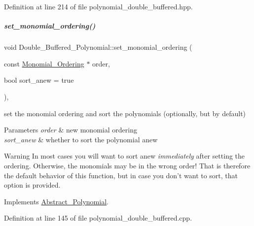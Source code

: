 Definition at line 214 of file polynomial\+\_\+double\+\_\+buffered.\+hpp.

\mbox{\label{group__polygroup_aa81be797dcced4e663d3fe54f6501ed6}} 
\subparagraph{\texorpdfstring{set\+\_\+monomial\+\_\+ordering()}{set\_monomial\_ordering()}}
{\footnotesize\ttfamily void Double\+\_\+\+Buffered\+\_\+\+Polynomial\+::set\+\_\+monomial\+\_\+ordering (\begin{DoxyParamCaption}\item[{const \hyperlink{group__orderinggroup_class_monomial___ordering}{Monomial\+\_\+\+Ordering} $\ast$}]{order,  }\item[{bool}]{sort\+\_\+anew = {\ttfamily true} }\end{DoxyParamCaption})\hspace{0.3cm}{\ttfamily [override]}, {\ttfamily [virtual]}}



set the monomial ordering and sort the polynomials (optionally, but by default) 


\begin{DoxyParams}{Parameters}
{\em order} & new monomial ordering \\
\hline
{\em sort\+\_\+anew} & whether to sort the polynomial anew \\
\hline
\end{DoxyParams}
\begin{DoxyWarning}{Warning}
In most cases you will want to sort anew {\itshape immediately} after setting the ordering. Otherwise, the monomials may be in the wrong order! That is therefore the default behavior of this function, but in case you don't want to sort, that option is provided. 
\end{DoxyWarning}


Implements \hyperlink{group__polygroup_a12e023570eb675343c4b7ed635a031dc}{Abstract\+\_\+\+Polynomial}.



Definition at line 145 of file polynomial\+\_\+double\+\_\+buffered.\+cpp.

